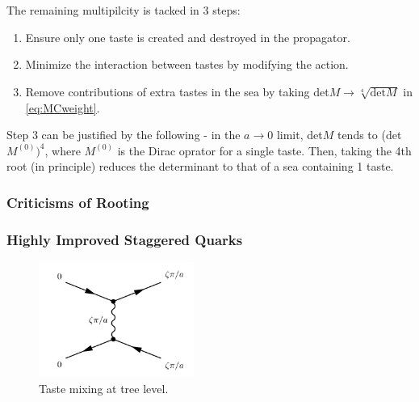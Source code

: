 \\ \\
The remaining multipilcity is tacked in 3 steps:
\begin{enumerate}
	\item
	Ensure only one taste is created and destroyed in the propagator.
	\item
	Minimize the interaction between tastes by modifying the action.
	\item
	Remove contributions of extra tastes in the sea by taking det$M \to \sqrt[4]{\text{det}M}$ in \eqref{eq:MCweight}.
\end{enumerate}
Step 3 can be justified by the following - in the $a\to 0$ limit, det$M$ tends to (det$M^{(0)})^4$, where $M^{(0)}$ is the Dirac oprator for a single taste. Then, taking the 4th root (in principle) reduces the determinant to that of a sea containing 1 taste.

\subsubsection{Criticisms of Rooting}

\subsubsection{Highly Improved Staggered Quarks}

\begin{figure}
  \begin{center}
    \includegraphics[width=
   0.45\textwidth]{images/tastemixing.jpg}
  \end{center}
  \caption{Taste mixing at tree level.}
  \label{fig:tastemixing}
\end{figure}

